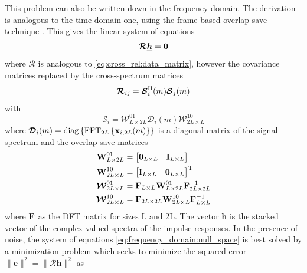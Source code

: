 \documentclass{article}
\newcommand{\x}{\mtxb{x}}
\newcommand{\hf}{\underline{\bm{h}}}
\newcommand{\Rf}{\bm{\mathcal{R}}}
\begin{document}
This problem can also be written down in the frequency domain.
The derivation is analogous to the time-domain one, using the frame-based overlap-save technique \cite{}.
This gives the linear system of equations 
\begin{equation}
    \Rf \hf = \bm{0} \label{eq:frequency_domain:null_space}\\
\end{equation}
where \(\Rf\) is analogous to \eqref{eq:cross_rel:data_matrix}, however the covariance matrices replaced by the cross-spectrum matrices 
\begin{equation}
    \Rf_{ij} = \bm{\mathcal{S}}_{i}^\herm (m) \bm{\mathcal{S}}_{j}(m)
\end{equation}
with 
\begin{equation}
    \bm{\mathcal{S}}_{i} = \bm{\mathcal{W}}^{01}_{L \times 2L} \bm{\mathcal{D}}_{i}(m) \bm{\mathcal{W}}^{10}_{2L \times L}
\end{equation}
where \(\bm{\mathcal{D}}_{i}(m) = \operatorname{diag} \left\{ \operatorname{FFT}_{2L} \left\{ \x_{i,2L}(m) \right\} \right\}\) is a diagonal matrix of the signal spectrum and the overlap-save matrices
\begin{align}
    \bm{\mathrm{W}}_{L \times 2L}^{01} &= \begin{bmatrix}
        \bm{\mathrm{0}}_{L \times L} & \bm{\mathrm{I}}_{L \times L}
    \end{bmatrix}\\
    \bm{\mathrm{W}}_{2L \times L}^{10} &= \begin{bmatrix}
        \bm{\mathrm{I}}_{L \times L} & \bm{\mathrm{0}}_{L \times L}
    \end{bmatrix}^{\mathrm{T}}\\
    \bm{\mathcal{W}}_{2L \times L}^{01} &= \bm{\mathrm{F}}_{L \times L} \bm{\mathrm{W}}_{L \times 2L}^{01} \bm{\mathrm{F}}_{2L \times 2L}^{-1}\\
    \bm{\mathcal{W}}_{2L \times L}^{10} &= \bm{\mathrm{F}}_{2L \times 2L} \bm{\mathrm{W}}_{2L \times L}^{10} \bm{\mathrm{F}}_{L \times L}^{-1}
\end{align} where $\bm{\mathrm{F}}$ as the DFT matrix for sizes L and 2L.
The vector \(\hf\) is the stacked vector of the complex-valued spectra of the impulse responses.
In the presence of noise, the system of equations \eqref{eq:frequency_domain:null_space} is best solved by a minimization problem which seeks to minimize the squared error \(\|\underline{\bm{e}} \|^2 = \| \Rf \hf \|^2\) as
\end{document}
